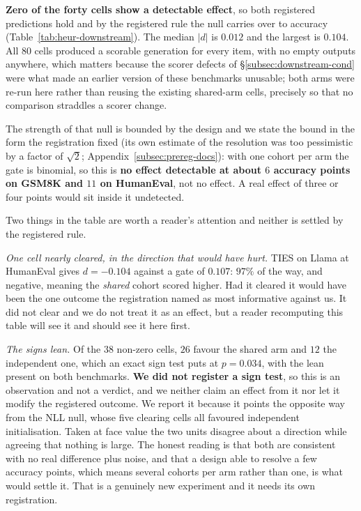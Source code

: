 \textbf{Zero of the forty cells show a detectable effect}, so both registered
predictions hold and by the registered rule the null carries over to accuracy
(Table~\ref{tab:heur-downstream}). The median $|d|$ is $0.012$ and the largest
is $0.104$. All $80$ cells produced a scorable generation for every item, with
no empty outputs anywhere, which matters because the scorer defects of
\S\ref{subsec:downstream-cond} were what made an earlier version of these
benchmarks unusable; both arms were re-run here rather than reusing the
existing shared-arm cells, precisely so that no comparison straddles a scorer
change.

The strength of that null is bounded by the design and we state the bound in
the form the registration fixed (its own estimate of the resolution was too
pessimistic by a factor of $\sqrt 2$; Appendix~\ref{subsec:prereg-docs}):
with one cohort per arm the gate is binomial, so this is
\textbf{no effect detectable at about $6$ accuracy points on GSM8K and $11$ on
HumanEval}, not no effect. A real effect of three or four points would sit
inside it undetected.

Two things in the table are worth a reader's attention and neither is settled
by the registered rule.

\emph{One cell nearly cleared, in the direction that would have hurt.} TIES on
Llama at HumanEval gives $d = -0.104$ against a gate of $0.107$: $97\%$ of the
way, and negative, meaning the \emph{shared} cohort scored higher. Had it
cleared it would have been the one outcome the registration named as most
informative against us. It did not clear and we do not treat it as an effect,
but a reader recomputing this table will see it and should see it here first.

\emph{The signs lean.} Of the $38$ non-zero cells, $26$ favour the shared arm
and $12$ the independent one, which an exact sign test puts at $p = 0.034$,
with the lean present on both benchmarks. \textbf{We did not register a sign
test}, so this is an observation and not a verdict, and we neither claim an
effect from it nor let it modify the registered outcome. We report it because
it points the opposite way from the NLL null, whose five clearing cells all
favoured independent initialisation. Taken at face value the two units
disagree about a direction while agreeing that nothing is large. The honest
reading is that both are consistent with no real difference plus noise, and
that a design able to resolve a few accuracy points, which means several
cohorts per arm rather than one, is what would settle it. That is a genuinely
new experiment and it needs its own registration.


